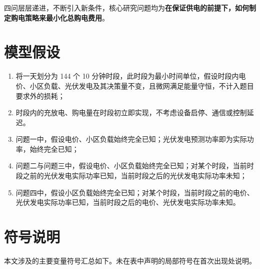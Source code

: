 \documentclass[withoutpreface,bwprint]{cumcmthesis} %
\begin{document}
四问层层递进，不断引入新条件，核心研究问题均为\textbf{在保证供电的前提下，如何制定购电策略来最小化总购电费用}。

\section{模型假设}

\begin{enumerate}
  \item 将一天划分为 144 个 10 分钟时段，此时段为最小时间单位，假设时段内电价、小区负载、光伏发电及其决策量不变，且微网满足能量守恒，不计入题目要求外的损耗；
  \item 时段内的充放电、购电量在时段初立即实现，不考虑设备启停、通信或控制延迟。
  \item 问题一中，假设电价、小区负载始终完全已知；光伏发电预测功率即为实际功率，始终完全已知；
  \item 问题二与问题三中，假设电价、小区负载始终完全已知；对某个时段，当前时段之前的光伏发电实际功率已知，当前时段之后的光伏发电实际功率未知；
  \item 问题四中，假设小区负载始终完全已知；对某个时段，当前时段之前的电价、光伏发电实际功率已知，当前时段之后的电价、光伏发电实际功率未知。
\end{enumerate}

\section{符号说明}

本文涉及的主要变量符号汇总如下。未在表中声明的局部符号在首次出现处说明。
\end{document}
